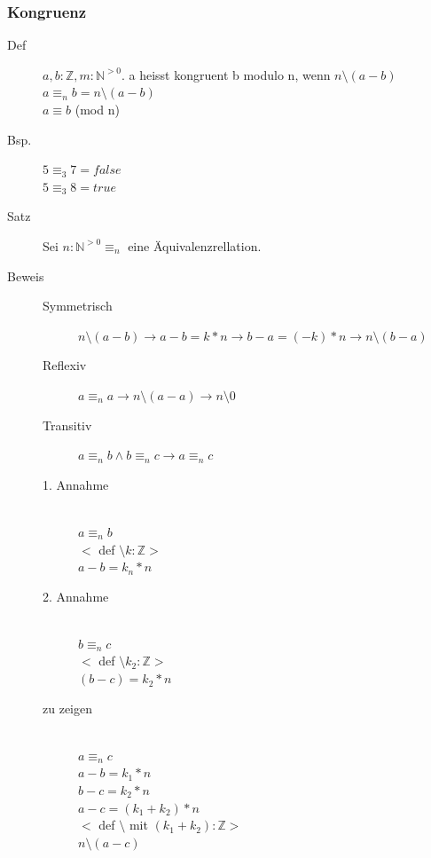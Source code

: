 \documentclass[a4paper,10pt]{article}
\newcommand{\NN}{\mathbb{N}} %
\newcommand{\ZN}{\mathbb{Z}} %
\newcommand{\ra}{\rightarrow}
\begin{document}
\subsubsection{Kongruenz}
\begin{description}
	\item[Def] $a,b:\ZN, m:{\NN}^{> 0}.$ a heisst kongruent b modulo n, wenn $n\setminus (a - b)$ \\
		$a {\equiv}_n b = n \setminus (a - b)$ \\
		$a \equiv b$ (mod n)
	\item[Bsp.] $5 {\equiv}_3 7 = false$ \\
		$5 {\equiv}_3 8 = true$ \\
	\item[Satz] Sei $n:{\NN} ^{>0} {\equiv}_n$ eine \"Aquivalenzrellation.
	\item[Beweis] \hfill
		\begin{description}
			\item[Symmetrisch] $n\setminus (a-b) \ra a-b = k* n \ra b-a = (-k)*n \ra n\setminus (b - a)$
			\item[Reflexiv] $ a {\equiv}_n a \ra n \setminus (a - a) \ra n \setminus 0$
			\item[Transitiv] $ a{\equiv}_n b \wedge b {\equiv}_n c \ra a {\equiv}_n c$
			\item[1. Annahme] \hfill \\
				 $a {\equiv}_n b$ \\
				$<$ def $\setminus k:\ZN>$ \\
				$a-b=k_n*n$
			\item[2. Annahme] \hfill \\
				$b {\equiv}_n c$ \\
				$<$ def $\setminus k_2:\ZN >$ \\
				$(b-c)=k_2*n$ 
			\item[zu zeigen] \hfill \\
				$a {\equiv}_n c$ \\
				$a-b = k_1 * n$ \\
				$b - c = k_2 *n$ \\
				$a-c = (k_1+k_2) * n$ \\
				$<$ def $\setminus$ mit $(k_1+k_2):\ZN >$ \\
				$n \setminus (a-c)$
		\end{description}
 \end{description}
\end{document}
